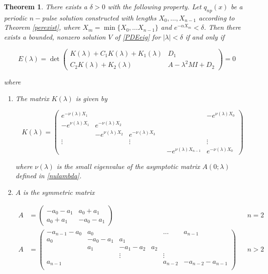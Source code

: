 \documentclass[12pt]{article}
\newtheorem{theorem}{Theorem}
\begin{document}
\begin{theorem}\label{blockmatrixtheorem}
There exists a $\delta > 0$ with the following property. Let $q_{np}(x)$ be a periodic $n-$pulse solution constructed with lengths $X_0, \dots, X_{n-1}$ according to Theorem \ref{perexist}, where $X_m = \min\{ X_0, \dots X_{n-1}\}$ and $e^{-\alpha X_m} < \delta$. Then there exists a bounded, nonzero solution $V$ of \eqref{PDEeig} for $|\lambda| < \delta$ if and only if 

\begin{equation}\label{blockeq}
E(\lambda) = \det
\begin{pmatrix}
K(\lambda) + C_1 K(\lambda) + K_1(\lambda) & D_1 \\
C_2 K(\lambda) + K_2(\lambda) & A - \lambda^2 MI + D_2
\end{pmatrix} = 0
\end{equation}

where 

\begin{enumerate}

\item The matrix $K(\lambda)$ is given by

\begin{equation}
K(\lambda) = 
\begin{pmatrix}
e^{-\nu(\lambda)X_1} & & & & & -e^{\nu(\lambda)X_0} \\
-e^{\nu(\lambda)X_1} & e^{-\nu(\lambda)X_2} \\
& -e^{\nu(\lambda)X_2} & e^{-\nu(\lambda)X_3} \\
\vdots & & \vdots & &&  \vdots \\
& & & & -e^{\nu(\lambda)X_{n-1}} & e^{-\nu(\lambda)X_0} 
\end{pmatrix}
\end{equation}

where $\nu(\lambda)$ is the small eigenvalue of the asymptotic matrix $A(0; \lambda)$ defined in \eqref{nulambda}.

\item $A$ is the symmetric matrix

\begin{align}\label{Asymm}
A &= \begin{pmatrix}
-a_0 -a_1 & a_0 + a_1 \\
a_0 + a_1 & -a_0 - a_1
\end{pmatrix} && n = 2 \\
A &= \begin{pmatrix}
-a_{n-1} - a_0 & a_0 & & & \dots & a_{n-1}\\
a_0 & -a_0 - a_1 &  a_1 \\
& a_1 & -a_1 - a_2 &  a_2 \\
& & \vdots & & \vdots \\
a_{n-1} & & & & a_{n-2} & -a_{n-2} - a_{n-1} \\
\end{pmatrix} && n > 2 \nonumber
\end{align}


\end{enumerate}
\end{theorem}
\end{document}
